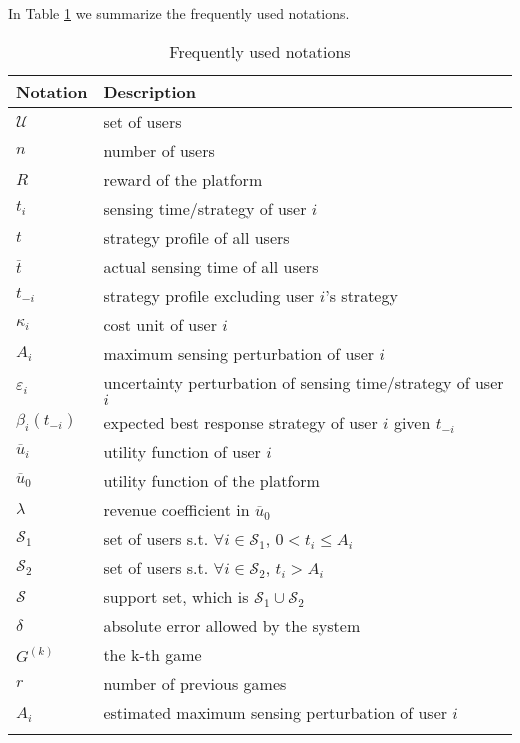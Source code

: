 \documentclass{IEEEtran}
\begin{document}

In Table \ref{tab:symbol_list} we summarize the frequently used notations.
\begin{table}[!t]
\begin{tabular}{l l}
\toprule
Notation & Description\\
\hline
$\mathcal{U}$ & set of users\\
$n$ & number of users\\
$R$ & reward of the platform\\
$t_i$ & sensing time/strategy of user $i$\\
$t$ & strategy profile of all users\\
$\overline{t}$ & actual sensing time of all users\\
$t_{-i}$ & strategy profile excluding user $i$'s strategy\\
$\kappa_i$ & cost unit of user $i$\\
$A_i$ & maximum {\color{black}sensing perturbation} of user $i$\\
$\varepsilon_i$ & uncertainty perturbation of sensing time/strategy of user $i$\\
$\beta_i(t_{-i})$ & expected best response strategy of user $i$ given $t_{-i}$\\
$\overline{u}_i$ & utility function of user $i$\\
$\overline{u}_0$ & utility function of the platform\\
$\lambda$ & revenue coefficient in $\overline{u}_0$\\
$\mathcal{S}_1$ & set of users s.t. $\forall i\in\mathcal{S}_1$, $0<t_i\leq A_i$\\
$\mathcal{S}_2$ & set of users s.t. $\forall i\in\mathcal{S}_2$, $t_i > A_i$\\
$\mathcal{S}$ & support set, which is $\mathcal{S}_1\cup\mathcal{S}_2$\\
$\delta$ & absolute error allowed by the system\\
$G^{(k)}$ & the k-th game\\
$r$ & number of previous games\\
$\hat{A}_i$ & estimated maximum {\color{black}sensing perturbation} of user $i$\\
\bottomrule
\smallskip
\end{tabular}
\caption{Frequently used notations}
\label{tab:symbol_list}
\end{table}
\end{document}
